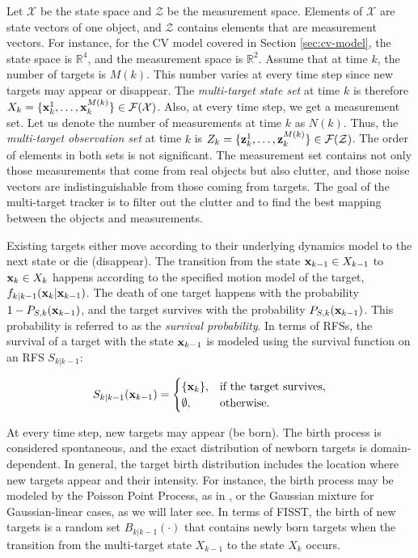 Let $\mathcal{X}$ be the state space and $\mathcal{Z}$ be the measurement space. Elements of $\mathcal{X}$ are state vectors of one object, and $\mathcal{Z}$ contains elements that are measurement vectors. For instance, for the CV model covered in Section \ref{sec:cv-model}, the state space is $\mathbb{R}^4$, and the measurement space is $\mathbb{R}^2$. Assume that at time $k$, the number of targets is $M(k)$. This number varies at every time step since new targets may appear or disappear. The \textit{multi-target state set} at time $k$ is therefore $X_k = \{\svecat{x}{k}{1}, \ldots, \svecat{x}{k}{M(k)}\} \in \mathcal{F}(\mathcal{X})$. Also, at every time step, we get a measurement set. Let us denote the number of measurements at time $k$ as $N(k)$. Thus, the \textit{multi-target observation set} at time $k$ is $Z_k = \{\svecat{z}{k}{1}, \ldots, \svecat{z}{k}{M(k)}\} \in \mathcal{F}(\mathcal{Z})$. The order of elements in both sets is not significant. The measurement set contains not only those measurements that come from real objects but also clutter, and those noise vectors are indistinguishable from those coming from targets. The goal of the multi-target tracker is to filter out the clutter and to find the best mapping between the objects and measurements.

Existing targets either move according to their underlying dynamics model to the next state or die (disappear). The transition from the state $\vecat{x}{k-1} \in X_{k-1}$ to $\vecat{x}{k} \in X_{k}$ happens according to the specified motion model of the target, $f_{k|k-1}(\vecat{x}{k} | \vecat{x}{k-1})$. The death of one target happens with the probability $1 - P_{S,k}(\vecat{x}{k-1})$, and the target survives with the probability $P_{S,k}(\vecat{x}{k-1})$. This probability is referred to as the \textit{survival probability}. In terms of RFSs, the survival of a target with the state $\vecat{x}{k-1}$ is modeled using the survival function on an RFS $S_{k|k-1}$:

\begin{equation}
    S_{k|k-1}(\vecat{x}{k-1}) = \begin{cases}
        \{\vecat{x}{k}\}, & \text{if the target survives}, \\
        \emptyset, & \text{otherwise}.
    \end{cases}
\end{equation}

At every time step, new targets may appear (be born). The birth process is considered spontaneous, and the exact distribution of newborn targets is domain-dependent. In general, the target birth distribution includes the location where new targets appear and their intensity. For instance, the birth process may be modeled by the Poisson Point Process, as in \cite{garcia-fernandezPoissonMultiBernoulliMixture2018}, or the Gaussian mixture for Gaussian-linear cases, as we will later see. In terms of FISST, the birth of new targets is a random set $B_{k|k-1}(\cdot)$ that contains newly born targets when the transition from the multi-target state $X_{k-1}$ to the state $X_{k}$ occurs.


